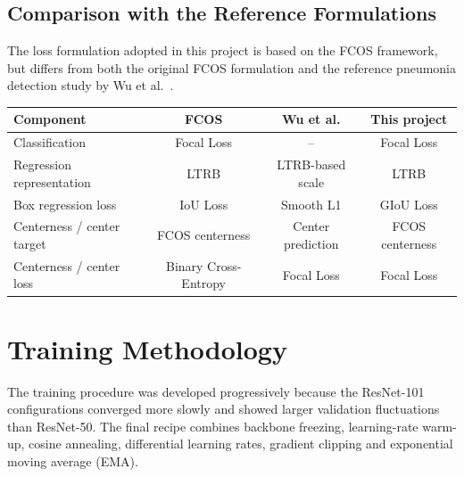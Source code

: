 \documentclass[11pt,a4paper]{article}
\begin{document}
\subsection{Comparison with the Reference Formulations}
\label{subsec:loss_comparison}

The loss formulation adopted in this project is based on the FCOS framework,
but differs from both the original FCOS formulation and the reference
pneumonia detection study by Wu et al.~\cite{tian2019fcos,wu2024pneumonia}.


\begin{center}
\begin{tabular}{lccc}
    \hline
    \textbf{Component} &
    \textbf{FCOS} &
    \textbf{Wu et al.} &
    \textbf{This project} \\
    \hline
    Classification &
    Focal Loss &
    -- &
    Focal Loss \\

    Regression representation &
    LTRB &
    LTRB-based scale &
    LTRB \\

    Box regression loss &
    IoU Loss &
    Smooth L1 &
    GIoU Loss \\

    Centerness / center target &
    FCOS centerness &
    Center prediction &
    FCOS centerness \\

    Centerness / center loss &
    Binary Cross-Entropy &
    Focal Loss &
    Focal Loss \\

    \hline
\end{tabular}
\end{center}













\section{Training Methodology}
\label{sec:training}

The training procedure was developed progressively because the ResNet-101 configurations converged more slowly and showed larger validation fluctuations than ResNet-50. The final recipe combines backbone freezing, learning-rate warm-up, cosine annealing, differential learning rates, gradient clipping and exponential moving average (EMA).
\end{document}
